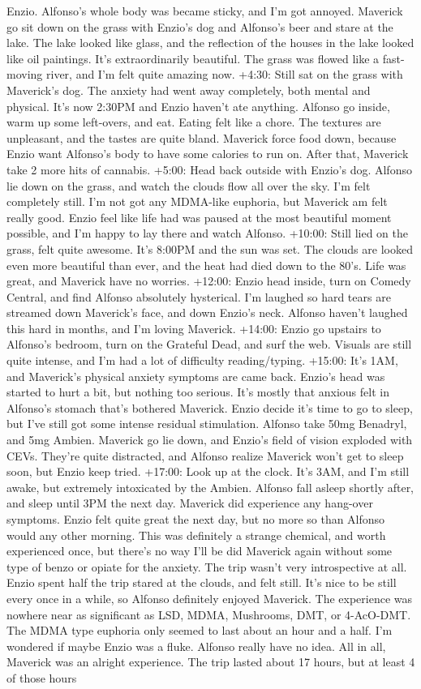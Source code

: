 \documentclass[12pt]{book}
\begin{document}
Enzio. Alfonso's whole body was became sticky, and I'm got annoyed. Maverick go sit down on the grass with Enzio's dog and Alfonso's beer and stare at the lake. The lake looked like glass, and the reflection of the houses in the lake looked like oil paintings. It's extraordinarily beautiful. The grass was flowed like a fast-moving river, and I'm felt quite amazing now. +4:30: Still sat on the grass with Maverick's dog. The anxiety had went away completely, both mental and physical. It's now 2:30PM and Enzio haven't ate anything. Alfonso go inside, warm up some left-overs, and eat. Eating felt like a chore. The textures are unpleasant, and the tastes are quite bland. Maverick force food down, because Enzio want Alfonso's body to have some calories to run on. After that, Maverick take 2 more hits of cannabis. +5:00: Head back outside with Enzio's dog. Alfonso lie down on the grass, and watch the clouds flow all over the sky. I'm felt completely still. I'm not got any MDMA-like euphoria, but Maverick am felt really good. Enzio feel like life had was paused at the most beautiful moment possible, and I'm happy to lay there and watch Alfonso. +10:00: Still lied on the grass, felt quite awesome. It's 8:00PM and the sun was set. The clouds are looked even more beautiful than ever, and the heat had died down to the 80's. Life was great, and Maverick have no worries. +12:00: Enzio head inside, turn on Comedy Central, and find Alfonso absolutely hysterical. I'm laughed so hard tears are streamed down Maverick's face, and down Enzio's neck. Alfonso haven't laughed this hard in months, and I'm loving Maverick. +14:00: Enzio go upstairs to Alfonso's bedroom, turn on the Grateful Dead, and surf the web. Visuals are still quite intense, and I'm had a lot of difficulty reading/typing. +15:00: It's 1AM, and Maverick's physical anxiety symptoms are came back. Enzio's head was started to hurt a bit, but nothing too serious. It's mostly that anxious felt in Alfonso's stomach that's bothered Maverick. Enzio decide it's time to go to sleep, but I've still got some intense residual stimulation. Alfonso take 50mg Benadryl, and 5mg Ambien. Maverick go lie down, and Enzio's field of vision exploded with CEVs. They're quite distracted, and Alfonso realize Maverick won't get to sleep soon, but Enzio keep tried. +17:00: Look up at the clock. It's 3AM, and I'm still awake, but extremely intoxicated by the Ambien. Alfonso fall asleep shortly after, and sleep until 3PM the next day. Maverick did experience any hang-over symptoms. Enzio felt quite great the next day, but no more so than Alfonso would any other morning. This was definitely a strange chemical, and worth experienced once, but there's no way I'll be did Maverick again without some type of benzo or opiate for the anxiety. The trip wasn't very introspective at all. Enzio spent half the trip stared at the clouds, and felt still. It's nice to be still every once in a while, so Alfonso definitely enjoyed Maverick. The experience was nowhere near as significant as LSD, MDMA, Mushrooms, DMT, or 4-AcO-DMT. The MDMA type euphoria only seemed to last about an hour and a half. I'm wondered if maybe Enzio was a fluke. Alfonso really have no idea. All in all, Maverick was an alright experience. The trip lasted about 17 hours, but at least 4 of those hours 
\end{document}

